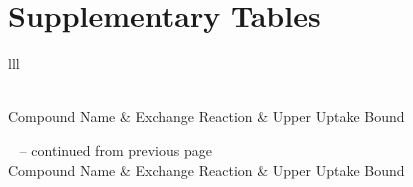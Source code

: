 \section{Supplementary Tables}

\begin{longtable}{lll}
	\caption{Medium Composition and Exchange Reaction Bounds}
	\label{tab:medium_composition_2}\\
	\toprule
	Compound Name & Exchange Reaction & Upper Uptake Bound \\
	\midrule
	\endfirsthead
	
	{{\tablename\ \thetable{} -- continued from previous page}} \\
	\toprule
	Compound Name & Exchange Reaction & Upper Uptake Bound \\
	\midrule
	\endhead
	
	\midrule
	 \\
	\endfoot
	

\end{longtable}

